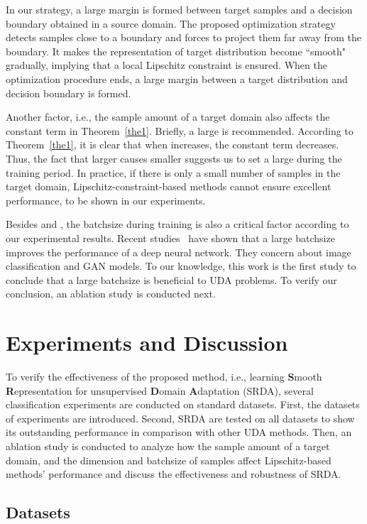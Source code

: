 \documentclass[journal,twocolumn]{IEEEtran}
\theoremstyle{definition}
\begin{document}
In our strategy, a large margin is formed between target samples and a decision boundary obtained in a source domain. The proposed optimization strategy detects samples close to a boundary and forces  to project them far away from the boundary. It makes the representation of target distribution become ``smooth" gradually, implying that a local Lipschitz constraint is ensured. When the optimization procedure ends, a large margin between a target distribution and decision boundary is formed.

Another factor, i.e., the sample amount of a target domain   also affects the constant term in Theorem~\ref{the1}. Briefly, a large  is recommended. According to Theorem~\ref{the1}, it is clear that when  increases, the constant term  decreases. Thus, the fact that larger  causes smaller  suggests us to set a large  during the training period. In practice, if there is only a small number of samples in the target domain, Lipschitz-constraint-based methods cannot ensure excellent performance, to be shown in our experiments.

Besides  and , the batchsize during training is also a critical factor according to our experimental results. Recent studies~\cite{brock2018large, He_2019_CVPR} have shown that a large batchsize improves the performance of a deep neural network. They concern about image classification and GAN models. To our knowledge, this work is the first study to conclude that a large batchsize is beneficial to UDA problems. To verify our conclusion, an ablation study is conducted next.

\section{Experiments and Discussion}
\label{experiments}

To verify the effectiveness of the proposed method, i.e., learning {\bf S}mooth {\bf R}epresentation for unsupervised {\bf D}omain {\bf A}daptation (SRDA), several classification experiments are conducted on standard datasets. First, the datasets of experiments are introduced. Second,  SRDA are tested on all datasets to show its outstanding performance in comparison with other UDA methods. Then, an ablation study is conducted to analyze how the sample amount of a target domain, and the dimension and batchsize of samples affect Lipschitz-based methods' performance and discuss the effectiveness and robustness of SRDA.

\subsection{Datasets}
\end{document}
